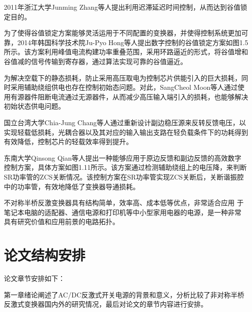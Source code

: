 2011年浙江大学Junming Zhang等人提出利用迟滞延迟时间控制\cite{zhang2011_vallye_switch1}，从而达到谷值锁定目的。

为了使得谷值锁定方案能够灵活运用于不同配置的变换器，并使得控制系统更加可靠，2014年韩国科学技术院Ju-Pyo Hong等人提出数字控制的谷值锁定方案如图1.5所示\cite{hong2014_vallye_switch2}。该方案利用峰值电流构建功率重叠范围，采用环路逼近的形式，将谷值增和谷值减的信号传输到寄存器，通过算法实现可靠的谷值逼近。

为解决空载下的静态损耗，防止采用高压取电为控制芯片供能引入的巨大损耗，同时采用辅助绕组供电也存在控制初始态问题。对此，SangCheol Moon等人通过使用有源器件阻断电流通过无源器件，从而减少高压输入端引入的损耗，也能够解决初始状态供电问题\cite{moon2011new_static_loss1}。


国立台湾大学Chia-Jung Chang等人通过重新设计副边稳压源来反转反馈电压，以实现轻载低损耗\cite{chang2012_static_loss2}，光耦合器以及其对应的输入输出支路在轻负载条件下的功耗得到有效降低，控制芯片的轻载效率得到提升。

东南大学Qinsong Qian等人提出一种能够应用于原边反馈和副边反馈的高效数字控制方案\cite{qian2022high_ZCS1}，具体方案如图1.11所示。该方案通过检测辅助绕组上的电压降，来判断SR功率管的ZCS关断情况。该控制方案在SR功率管实现ZCS关断后，关断谐振腔中的功率管，有效地降低了变换器导通损耗。

不对称半桥反激变换器具有结构简单，效率高、成本低等优点，非常适合应用 于笔记本电脑的适配器、通信电源和打印机等中小型家用电器的电源，是一种非常 具有研究价值和应用前景的电路拓扑。

\section{论文结构安排}


论文章节安排如下： 

第一章绪论阐述了AC/DC反激式开关电源的背景和意义，分析比较了非对称半桥反激式变换器国内外的研究情况，最后对论文的章节内容进行安排。 


